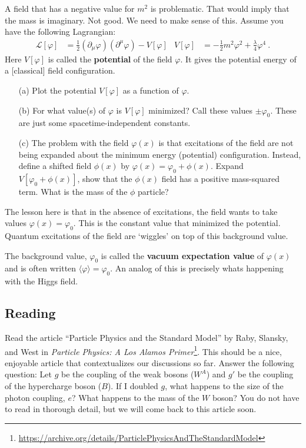 \documentclass[12pt]{article}
\begin{document}
A field that has a negative value for $m^2$ is problematic. That would imply that the mass is imaginary. Not good. We need to make sense of this. Assume you have the following Lagrangian:
\begin{align}
	\mathcal L[\varphi] &=
	\frac{1}{2}\left( \partial_\mu\varphi\right)\left(\partial^\mu \varphi\right) - V[\varphi]
	&
	V[\varphi] &=
	-\frac{1}{2} m^2 \varphi^2 + \frac{\lambda}{4} \varphi^4 \ .
\end{align}
Here $V[\varphi]$ is called the \textbf{potential} of the field $\varphi$. It gives the potential energy of a [classical] field configuration.
\begin{enumerate}
	\item[(a)] Plot the potential $V[\varphi]$ as a function of $\varphi$.
	\item[(b)] For what value(s) of $\varphi$ is $V[\varphi]$ minimized? Call these values $\pm\varphi_0$. These are just some spacetime-independent constants.
	\item[(c)] The problem with the field $\varphi(x)$ is that excitations of the field are not being expanded about the minimum energy (potential) configuration. Instead, define a shifted field $\phi(x)$ by $\varphi(x) = \varphi_0 + \phi(x)$. Expand $V[\varphi_0 + \phi(x)]$, show that the $\phi(x)$ field has a positive mass-squared term. What is the mass of the $\phi$ particle?
\end{enumerate}
The lesson here is that in the absence of excitations, the field wants to take values $\varphi(x) = \varphi_0$. This is the constant value that minimized the potential. Quantum excitations of the field are `wiggles' on top of this background value.

The background value, $\varphi_0$ is called the \textbf{vacuum expectation value} of $\varphi(x)$ and is often written $\langle \varphi \rangle = \varphi_0$. An analog of this is precisely whats happening with the Higgs field. 



\subsection{Reading}

Read the article ``Particle Physics and the Standard Model'' by Raby, Slansky, and West in \emph{Particle Physics: A Los Alamos Primer}\footnote{\url{https://archive.org/details/ParticlePhysicsAndTheStandardModel}}. This should be a nice, enjoyable article that contextualizes our discussions so far. Answer the following question: Let $g$ be the coupling of the weak bosons ($W^A$) and $g'$ be the coupling of the hypercharge boson ($B$). If I doubled $g$, what happens to the size of the photon coupling, $e$? What happens to the mass of the $W$ boson? You do not have to read in thorough detail, but we will come back to this article soon.
\end{document}
